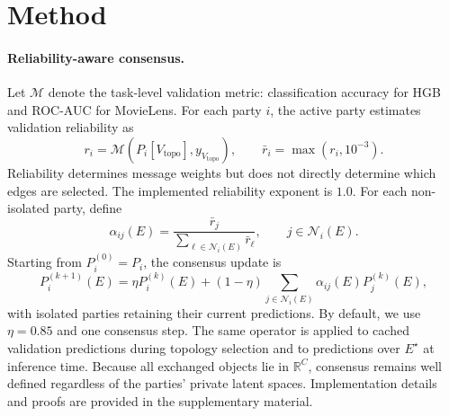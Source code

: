 \documentclass[letterpaper]{article} %
\begin{document}
\section{Method}

\paragraph{Reliability-aware consensus.}
Let $\mathcal{M}$ denote the task-level validation metric: classification
accuracy for HGB and ROC-AUC for MovieLens. For each party $i$, the active
party estimates validation reliability as
\begin{equation}
r_i =
\mathcal{M}\!\left(
P_i[V_{\mathrm{topo}}],
y_{V_{\mathrm{topo}}}
\right),
\qquad
\bar r_i=\max(r_i,10^{-3}).
\label{eq:reliability}
\end{equation}
Reliability determines message weights but does not directly determine which
edges are selected. The implemented reliability exponent is $1.0$. For each
non-isolated party, define
\begin{equation}
\alpha_{ij}(E) =
\frac{\bar r_j}
{\sum_{\ell\in\mathcal{N}_i(E)}\bar r_\ell},
\qquad
j\in\mathcal{N}_i(E).
\label{eq:consensus_weight}
\end{equation}
Starting from $P_i^{(0)}=P_i$, the consensus update is
\begin{equation}
P_i^{(k+1)}(E)
=
\eta P_i^{(k)}(E)
+
(1-\eta)
\sum_{j\in\mathcal{N}_i(E)}
\alpha_{ij}(E)P_j^{(k)}(E),
\label{eq:consensus}
\end{equation}
with isolated parties retaining their current predictions. By default, we use
$\eta=0.85$ and one consensus step. The same operator is applied to cached
validation predictions during topology selection and to predictions over
$E^\star$ at inference time. Because all exchanged objects lie in
$\mathbb{R}^C$, consensus remains well defined regardless of the parties'
private latent spaces. Implementation details and proofs are provided in the
supplementary material.
\end{document}
